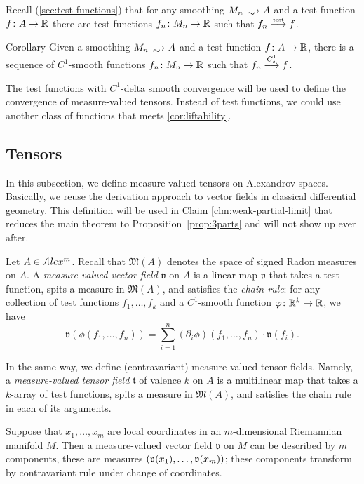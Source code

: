 Recall (\ref{sec:test-functions}) that for any smoothing $M_n\smooths{} A$ and a test function $f\colon A\to\mathbb{R}$ there are test functions  $f_n\colon M_n\to \mathbb{R}$ such that $f_n\stackrel{\text{\tiny\rm test}}{\longrightarrow} f$.

\begin{thm}{Corollary}\label{cor:liftability}
Given a smoothing $M_n\smooths{} A$ and a test function $f\colon A\to\mathbb{R}$,
there is a sequence of $C^1$-smooth functions $f_n\colon M_n\to \mathbb{R}$ such that $f_n\stackrel{C^1_\delta}{\longrightarrow} f$.
\end{thm}

The test functions with $C^1$-delta smooth convergence will be used to define the convergence of measure-valued tensors.
Instead of test functions, we could use another class of functions that meets \ref{cor:liftability}.

 
\subsection{Tensors}\label{subsec:tensors}

In this subsection, we define measure-valued tensors on Alexandrov spaces.
Basically, we reuse the derivation approach to vector fields in classical differential geometry.
This definition will be used in Claim \ref{clm:weak-partial-limit} that reduces the main theorem to Proposition~\ref{prop:3parts} and will not show up ever after.

Let $A\in \mathcal{A}lex^m$.
Recall that $\mathfrak M(A)$
denotes the space of signed Radon measures on $A$.
A \emph{measure-valued vector field} $\mathfrak{v}$  on $A$
is a linear map
$\mathfrak{v}$ that takes a test function,
spits a measure in $\mathfrak M(A)$,
and satisfies the \emph{chain rule}:
for any collection of test functions $f_1,\dots,f_k$
and a $C^1$-smooth function $\varphi\colon\mathbb{R}^k\to\mathbb{R}$, we have
$$\mathfrak{v}(\phi(f_1,\dots,f_n))
=
\sum_{i=1}^n (\partial_i\phi)(f_1,\dots,f_n)\cdot\mathfrak{v}(f_i).
$$

In the same way, we define (contravariant) measure-valued tensor fields.
Namely, a \emph{measure-valued tensor field} $\mathfrak{t}$ of valence $k$ on $A$ is a multilinear map that takes a $k$-array of test  functions, spits a measure in $\mathfrak M(A)$, and satisfies the chain rule in each of its arguments.

Suppose that $x_1,\dots,x_m$ are local coordinates in an $m$-dimensional Riemannian manifold $M$.
Then a measure-valued vector field $\mathfrak{v}$ on $M$ can be described by $m$ components, these are measures $(\vv(x_1),\zz\dots,\vv(x_m))$;
these components transform by contravariant rule under change of coordinates.

